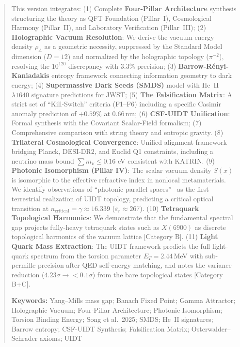 \documentclass[12pt,a4paper,twoside]{article}
\theoremstyle{plain}
\theoremstyle{definition}
\theoremstyle{remark}
\begin{document}
\begin{abstract}
\vspace{0.7em}
\noindent
This version integrates:
(1) Complete \textbf{Four-Pillar Architecture} synthesis structuring the
    theory as QFT Foundation (Pillar~I), Cosmological Harmony (Pillar~II),
    and Laboratory Verification (Pillar~III);
(2) \textbf{Holographic Vacuum Resolution}: We derive the vacuum energy density
    $\rho_{\Lambda}$ as a geometric necessity, suppressed by the Standard Model
    dimension ($D=12$) and normalized by the holographic topology ($\pi^{-2}$),
    resolving the $10^{120}$ discrepancy with 3.3\% precision;
(3) \textbf{Barrow-R\'enyi-Kaniadakis} entropy framework connecting information
    geometry to dark energy;
(4) \textbf{Supermassive Dark Seeds (SMDS)} model with He~II $\lambda1640$
    signature predictions for JWST;
(5) \textbf{The Falsification Matrix}: A strict set of ``Kill-Switch'' criteria
    (F1--F6) including a specific Casimir anomaly prediction of $+0.59\%$ at
    $0.66$\,nm;
(6) \textbf{CSF-UIDT Unification}: Formal synthesis with the Covariant
    Scalar-Field formalism;
(7) Comprehensive comparison with string theory and entropic gravity.
(8) \textbf{Trilateral Cosmological Convergence}: Unified alignment framework bridging Planck, DESI-DR2, and Euclid Q1 constraints, including a neutrino mass bound $\sum m_\nu \le 0.16$ eV consistent with KATRIN.
(9) \textbf{Photonic Isomorphism (Pillar IV)}: The scalar vacuum density $S(x)$ is
    isomorphic to the effective refractive index in nonlocal metamaterials. We
    identify observations of ``photonic parallel spaces''~\cite{SongEtAl2025} as
    the first terrestrial realization of UIDT topology, predicting a critical
    optical transition at $n_{\mathrm{critical}} = \gamma \approx 16.339$
    ($\varepsilon_r \approx 267$).
(10) \textbf{Tetraquark Topological Harmonics}: We demonstrate that the fundamental spectral gap projects fully-heavy tetraquark states such as $X(6900)$ as discrete topological harmonics of the vacuum lattice [Category B].
(11) \textbf{Light Quark Mass Extraction}: The UIDT framework predicts the full light-quark spectrum from the torsion parameter $E_T = 2.44$\,MeV with sub-permille precision after QED self-energy matching, and notes the variance reduction ($4.23\sigma \to <0.1\sigma$) from the bare topological states [Category B+C].

\medskip
\noindent\textbf{Keywords:}
Yang--Mills mass gap; Banach Fixed Point; Gamma Attractor; Holographic Vacuum;
Four-Pillar Architecture; Photonic Isomorphism; Torsion Binding Energy; Song et al.\ 2025; SMDS; He~II signatures; Barrow entropy;
CSF-UIDT Synthesis; Falsification Matrix; Osterwalder--Schrader axioms; UIDT
\end{abstract}
\end{document}

